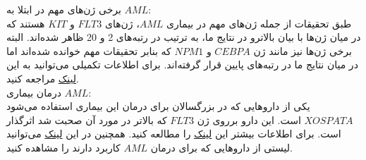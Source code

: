 \documentclass[a4paper,12pt]{article}
\begin{document}
برخی ژن‌های مهم در ابتلا به $AML$:\\
طبق تحقیقات از جمله ژن‌های مهم در بیماری $AML$، ژن‌های $FLT3$ و $KIT$ هستند که در میان ژن‌ها با بیان بالاترو در نتایج ما، به ترتیب در رتبه‌های 2 و 20 ظاهر شده‌اند. البته برخی ژن‌ها نیز مانند ژن $CEBPA$ و $NPM1$ که بنابر تحقیقات مهم خوانده شده‌اند اما در میان نتایج ما در رتبه‌های پایین قرار گرفته‌اند. برای اطلاعات تکمیلی می‌توانید به این
\href{https://www.ncbi.nlm.nih.gov/pmc/articles/PMC5767295/#:~:text=Recently%2C%20with%20the%20development%20of,%2C%20ASXL1%2C%20PTPN11%20and%20CBL.}{لینک}
مراجعه کنید.\\
درمان بیماری $AML$:\\
یکی از داروهایی که در بزرگسالان برای درمان این بیماری استفاده می‌شود
$XOSPATA$
است. این دارو برروی ژن
$FLT3$
که بالاتر در مورد آن صحبت شد اثرگذار است. برای اطلاعات بیشتر این
\href{https://www.xospata.com/?gclid=Cj0KCQiAgP6PBhDmARIsAPWMq6n3jJhNQjcKUpJGAGSPHgIlPkbCdjJn69pUDozbftPdSNqCMeMxLqEaAsE2EALw_wcB&gclsrc=aw.ds}{لینک}
را مطالعه کنید. همچنین در این
\href{https://www.cancer.gov/about-cancer/treatment/drugs/leukemia#3}{لینک}
می‌توانید لیستی از داروهایی که برای درمان $AML$ کاربرد دارند را مشاهده کنید.
\end{document}
